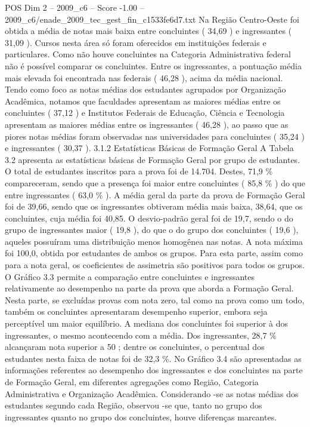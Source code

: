 \begin{textsample}{POS Dim 2 – 2009\_c6 – Score -1.00 – 2009\_c6/enade\_2009\_tec\_gest\_fin\_c1533fe6d7.txt}
Na Região Centro-Oeste foi obtida a média de notas mais baixa entre concluintes ( 34,69 ) e ingressantes ( 31,09 ).
Cursos nesta área só foram oferecidos em instituições federais e particulares.
Como não houve concluintes na Categoria Administrativa federal não é possível comparar os concluintes.
Entre os ingressantes, a pontuação média mais elevada foi encontrada nas federais ( 46,28 ), acima da média nacional.
Tendo como foco as notas médias dos estudantes agrupados por Organização Acadêmica, notamos que faculdades apresentam as maiores médias entre os concluintes ( 37,12 ) e Institutos Federais de Educação, Ciência e Tecnologia apresentam as maiores médias entre os ingressantes ( 46,28 ), ao passo que as piores notas médias foram observadas nas universidades para concluintes ( 35,24 ) e ingressantes ( 30,37 ). 3.1.2 Estatísticas Básicas de Formação Geral A Tabela 3.2 apresenta as estatísticas básicas de Formação Geral por grupo de estudantes.
O total de estudantes inscritos para a prova foi de 14.704.
Destes, 71,9 \% compareceram, sendo que a presença foi maior entre concluintes ( 85,8 \% ) do que entre ingressantes ( 63,0 \% ).
A média geral da parte da prova de Formação Geral foi de 39,66, sendo que os ingressantes obtiveram média mais baixa, 38,64, que os concluintes, cuja média foi 40,85.
O desvio-padrão geral foi de 19,7, sendo o do grupo de ingressantes maior ( 19,8 ), do que o do grupo dos concluintes ( 19,6 ), aqueles possuíram uma distribuição menos homogênea nas notas.
A nota máxima foi 100,0, obtida por estudantes de ambos os grupos.
Para esta parte, assim como para a nota geral, os coeficientes de assimetria são positivos para todos os grupos.
O Gráfico 3.3 permite a comparação entre concluintes e ingressantes relativamente ao desempenho na parte da prova que aborda a Formação Geral.
Nesta parte, se excluídas provas com nota zero, tal como na prova como um todo, também os concluintes apresentaram desempenho superior, embora seja perceptível um maior equilíbrio.
A mediana dos concluintes foi superior à dos ingressantes, o mesmo acontecendo com a média.
Dos ingressantes, 28,7 \% alcançaram nota superior a 50 ; dentre os concluintes, o percentual dos estudantes nesta faixa de notas foi de 32,3 \%.
No Gráfico 3.4 são apresentadas as informações referentes ao desempenho dos ingressantes e dos concluintes na parte de Formação Geral, em diferentes agregações como Região, Categoria Administrativa e Organização Acadêmica.
Considerando -se as notas médias dos estudantes segundo cada Região, observou -se que, tanto no grupo dos ingressantes quanto no grupo dos concluintes, houve diferenças marcantes.

\end{textsample}
